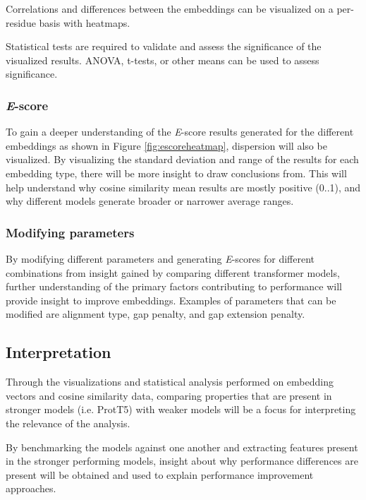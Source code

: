 \documentclass[
	letterpaper, %
	10pt, %
]{journalArticle}
\begin{document}
Correlations and differences between the embeddings can be visualized on a per-residue basis with heatmaps.

Statistical tests are required to validate and assess the significance of the visualized results. ANOVA, t-tests, or other means can be used to assess significance.

\subsubsection{\textit{E}-score}

To gain a deeper understanding of the \textit{E}-score results generated for the different embeddings as shown in Figure \ref{fig:escoreheatmap}, dispersion will also be visualized. By visualizing the standard deviation and range of the results for each embedding type, there will be more insight to draw conclusions from. This will help understand why cosine similarity mean results are mostly positive (0..1), and why different models generate broader or narrower average ranges.

\subsubsection{Modifying parameters}

By modifying different parameters and generating \textit{E}-scores for different combinations from insight gained by comparing different transformer models, further understanding of the primary factors contributing to performance will provide insight to improve embeddings. Examples of parameters that can be modified are alignment type, gap penalty, and gap extension penalty.

\subsection{Interpretation}
Through the visualizations and statistical analysis performed on embedding vectors and cosine similarity data, comparing properties that are present in stronger models (i.e. ProtT5) with weaker models will be a focus for interpreting the relevance of the analysis.

By benchmarking the models against one another and extracting features present in the stronger performing models, insight about why performance differences are present will be obtained and used to explain performance improvement approaches.
\end{document}
